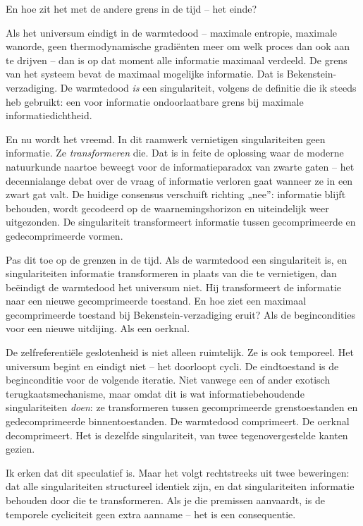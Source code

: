 \documentclass[11pt, twoside, openright]{book}
\begin{document}
En hoe zit het met de andere grens in de tijd -- het einde?

Als het universum eindigt in de warmtedood -- maximale entropie, maximale wanorde, geen thermodynamische gradiënten meer om welk proces dan ook aan te drijven -- dan is op dat moment alle informatie maximaal verdeeld. De grens van het systeem bevat de maximaal mogelijke informatie. Dat is Bekenstein-verzadiging. De warmtedood \textit{is} een singulariteit, volgens de definitie die ik steeds heb gebruikt: een voor informatie ondoorlaatbare grens bij maximale informatiedichtheid.

En nu wordt het vreemd. In dit raamwerk vernietigen singulariteiten geen informatie. Ze \textit{transformeren} die. Dat is in feite de oplossing waar de moderne natuurkunde naartoe beweegt voor de informatieparadox van zwarte gaten -- het decennialange debat over de vraag of informatie verloren gaat wanneer ze in een zwart gat valt. De huidige consensus verschuift richting „nee”: informatie blijft behouden, wordt gecodeerd op de waarnemingshorizon en uiteindelijk weer uitgezonden. De singulariteit transformeert informatie tussen gecomprimeerde en gedecomprimeerde vormen.

Pas dit toe op de grenzen in de tijd. Als de warmtedood een singulariteit is, en singulariteiten informatie transformeren in plaats van die te vernietigen, dan beëindigt de warmtedood het universum niet. Hij transformeert de informatie naar een nieuwe gecomprimeerde toestand. En hoe ziet een maximaal gecomprimeerde toestand bij Bekenstein-verzadiging eruit? Als de begincondities voor een nieuwe uitdijing. Als een oerknal.

De zelfreferentiële geslotenheid is niet alleen ruimtelijk. Ze is ook temporeel. Het universum begint en eindigt niet -- het doorloopt cycli. De eindtoestand is de beginconditie voor de volgende iteratie. Niet vanwege een of ander exotisch terugkaatsmechanisme, maar omdat dit is wat informatiebehoudende singulariteiten \textit{doen}: ze transformeren tussen gecomprimeerde grenstoestanden en gedecomprimeerde binnentoestanden. De warmtedood comprimeert. De oerknal decomprimeert. Het is dezelfde singulariteit, van twee tegenovergestelde kanten gezien.

Ik erken dat dit speculatief is. Maar het volgt rechtstreeks uit twee beweringen: dat alle singulariteiten structureel identiek zijn, en dat singulariteiten informatie behouden door die te transformeren. Als je die premissen aanvaardt, is de temporele cycliciteit geen extra aanname -- het is een consequentie.
\end{document}
